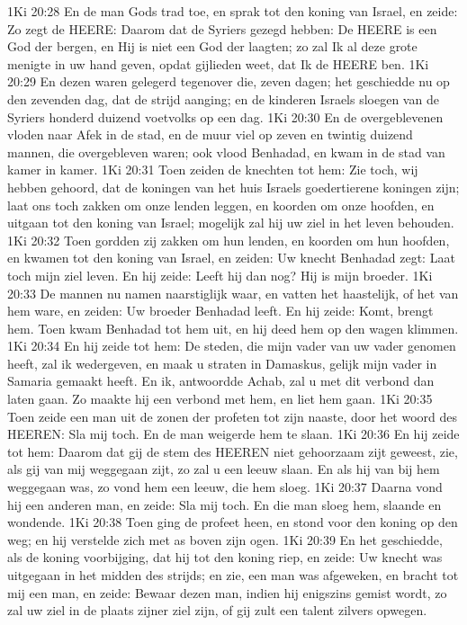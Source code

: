 1Ki 20:28  En de man Gods trad toe, en sprak tot den koning van Israel, en zeide: Zo zegt de HEERE: Daarom dat de Syriers gezegd hebben: De HEERE is een God der bergen, en Hij is niet een God der laagten; zo zal Ik al deze grote menigte in uw hand geven, opdat gijlieden weet, dat Ik de HEERE ben.
1Ki 20:29  En dezen waren gelegerd tegenover die, zeven dagen; het geschiedde nu op den zevenden dag, dat de strijd aanging; en de kinderen Israels sloegen van de Syriers honderd duizend voetvolks op een dag.
1Ki 20:30  En de overgeblevenen vloden naar Afek in de stad, en de muur viel op zeven en twintig duizend mannen, die overgebleven waren; ook vlood Benhadad, en kwam in de stad van kamer in kamer.
1Ki 20:31  Toen zeiden de knechten tot hem: Zie toch, wij hebben gehoord, dat de koningen van het huis Israels goedertierene koningen zijn; laat ons toch zakken om onze lenden leggen, en koorden om onze hoofden, en uitgaan tot den koning van Israel; mogelijk zal hij uw ziel in het leven behouden.
1Ki 20:32  Toen gordden zij zakken om hun lenden, en koorden om hun hoofden, en kwamen tot den koning van Israel, en zeiden: Uw knecht Benhadad zegt: Laat toch mijn ziel leven. En hij zeide: Leeft hij dan nog? Hij is mijn broeder.
1Ki 20:33  De mannen nu namen naarstiglijk waar, en vatten het haastelijk, of het van hem ware, en zeiden: Uw broeder Benhadad leeft. En hij zeide: Komt, brengt hem. Toen kwam Benhadad tot hem uit, en hij deed hem op den wagen klimmen.
1Ki 20:34  En hij zeide tot hem: De steden, die mijn vader van uw vader genomen heeft, zal ik wedergeven, en maak u straten in Damaskus, gelijk mijn vader in Samaria gemaakt heeft. En ik, antwoordde Achab, zal u met dit verbond dan laten gaan. Zo maakte hij een verbond met hem, en liet hem gaan.
1Ki 20:35  Toen zeide een man uit de zonen der profeten tot zijn naaste, door het woord des HEEREN: Sla mij toch. En de man weigerde hem te slaan.
1Ki 20:36  En hij zeide tot hem: Daarom dat gij de stem des HEEREN niet gehoorzaam zijt geweest, zie, als gij van mij weggegaan zijt, zo zal u een leeuw slaan. En als hij van bij hem weggegaan was, zo vond hem een leeuw, die hem sloeg.
1Ki 20:37  Daarna vond hij een anderen man, en zeide: Sla mij toch. En die man sloeg hem, slaande en wondende.
1Ki 20:38  Toen ging de profeet heen, en stond voor den koning op den weg; en hij verstelde zich met as boven zijn ogen.
1Ki 20:39  En het geschiedde, als de koning voorbijging, dat hij tot den koning riep, en zeide: Uw knecht was uitgegaan in het midden des strijds; en zie, een man was afgeweken, en bracht tot mij een man, en zeide: Bewaar dezen man, indien hij enigszins gemist wordt, zo zal uw ziel in de plaats zijner ziel zijn, of gij zult een talent zilvers opwegen.
